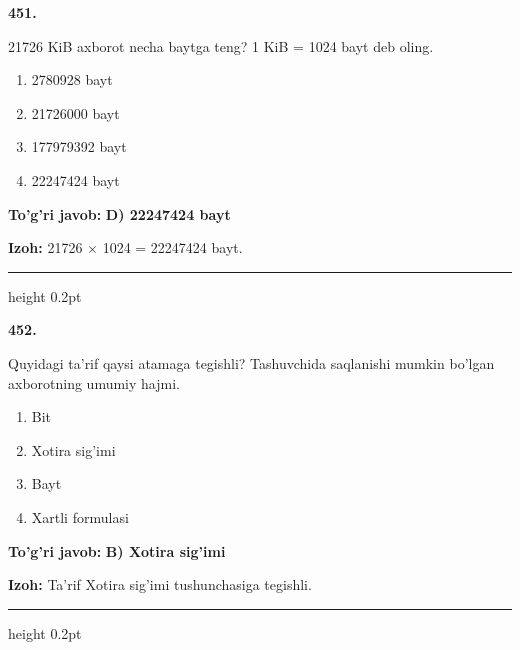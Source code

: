 \documentclass[10pt,a4paper,oneside]{article}
\begin{document}
\noindent\textbf{\color{ink}451.}
\par
21726 KiB axborot necha baytga teng? 1 KiB = 1024 bayt deb oling.
\begin{enumerate}[label=\Alph*),leftmargin=9mm]
\item 2780928 bayt
\item 21726000 bayt
\item 177979392 bayt
\item 22247424 bayt
\end{enumerate}
\begin{tcolorbox}[enhanced,breakable,colback=teal!4,colframe=teal!50!black,boxrule=0.5pt,arc=1.1mm,left=3mm,right=3mm,top=1.7mm,bottom=1.7mm,before skip=2mm,after skip=2mm]
\textbf{\color{teal}To'g'ri javob:} \textbf{D) 22247424 bayt}
\par\smallskip
\textbf{Izoh:} 21726 \ensuremath{\times} 1024 = 22247424 bayt.
\end{tcolorbox}
\vspace{2mm}\hrule height 0.2pt \vspace{3mm}

\noindent\textbf{\color{ink}452.}
\par
Quyidagi ta'rif qaysi atamaga tegishli? Tashuvchida saqlanishi mumkin bo'lgan axborotning umumiy hajmi.
\begin{enumerate}[label=\Alph*),leftmargin=9mm]
\item Bit
\item Xotira sig'imi
\item Bayt
\item Xartli formulasi
\end{enumerate}
\begin{tcolorbox}[enhanced,breakable,colback=teal!4,colframe=teal!50!black,boxrule=0.5pt,arc=1.1mm,left=3mm,right=3mm,top=1.7mm,bottom=1.7mm,before skip=2mm,after skip=2mm]
\textbf{\color{teal}To'g'ri javob:} \textbf{B) Xotira sig'imi}
\par\smallskip
\textbf{Izoh:} Ta'rif Xotira sig'imi tushunchasiga tegishli.
\end{tcolorbox}
\vspace{2mm}\hrule height 0.2pt \vspace{3mm}
\end{document}
